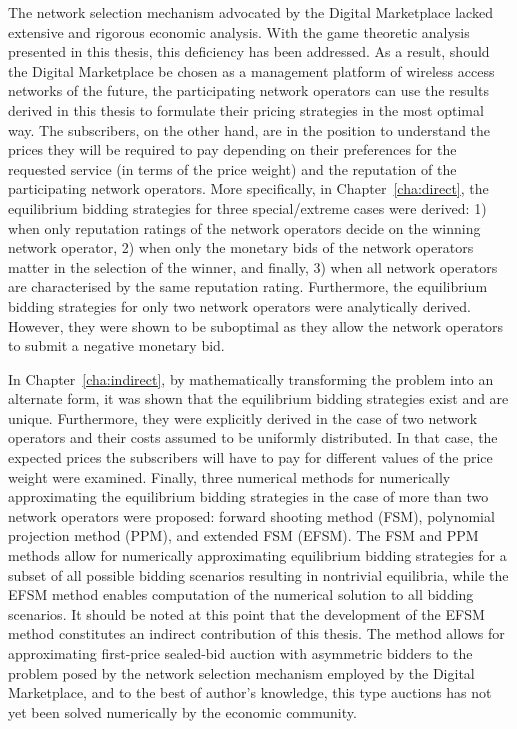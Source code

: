 The network selection mechanism advocated by the Digital Marketplace lacked extensive and rigorous economic analysis. With the game theoretic analysis presented in this thesis, this deficiency has been addressed. As a result, should the Digital Marketplace be chosen as a management platform of wireless access networks of the future, the participating network operators can use the results derived in this thesis to formulate their pricing strategies in the most optimal way. The subscribers, on the other hand, are in the position to understand the prices they will be required to pay depending on their preferences for the requested service (in terms of the price weight) and the reputation of the participating network operators. More specifically, in Chapter~\ref{cha:direct}, the equilibrium bidding strategies for three special/extreme cases were derived: 1) when only reputation ratings of the network operators decide on the winning network operator, 2) when only the monetary bids of the network operators matter in the selection of the winner, and finally, 3) when all network operators are characterised by the same reputation rating. Furthermore, the equilibrium bidding strategies for only two network operators were analytically derived. However, they were shown to be suboptimal as they allow the network operators to submit a negative monetary bid.

In Chapter~\ref{cha:indirect}, by mathematically transforming the problem into an alternate form, it was shown that the equilibrium bidding strategies exist and are unique. Furthermore, they were explicitly derived in the case of two network operators and their costs assumed to be uniformly distributed. In that case, the expected prices the subscribers will have to pay for different values of the price weight were examined. Finally, three numerical methods for numerically approximating the equilibrium bidding strategies in the case of more than two network operators were proposed: forward shooting method (FSM), polynomial projection method (PPM), and extended FSM (EFSM). The FSM and PPM methods allow for numerically approximating equilibrium bidding strategies for a subset of all possible bidding scenarios resulting in nontrivial equilibria, while the EFSM method enables computation of the numerical solution to all bidding scenarios. It should be noted at this point that the development of the EFSM method constitutes an indirect contribution of this thesis. The method allows for approximating first-price sealed-bid auction with asymmetric bidders to the problem posed by the network selection mechanism employed by the Digital Marketplace, and to the best of author's knowledge, this type auctions has not yet been solved numerically by the economic community.

